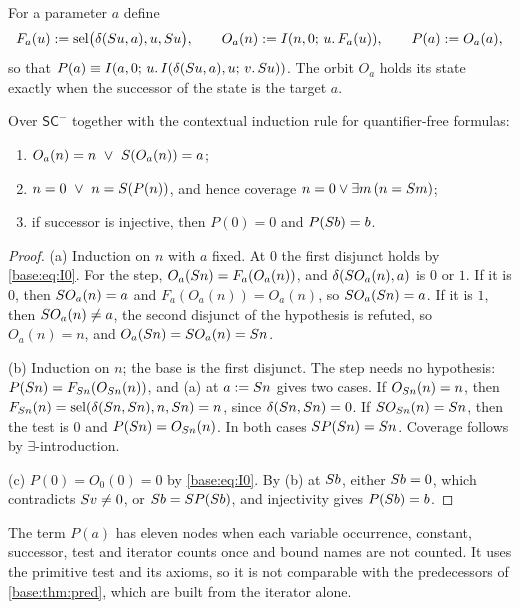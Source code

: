 For a parameter $a$ define
\[
 F_a(u)\mathrel{:=}\operatorname{sel}\bigl(\delta(S u,a),u,S u\bigr),\qquad
 O_a(n)\mathrel{:=}I(n,0;\,u.\,F_a(u)),\qquad
 P(a)\mathrel{:=} O_a(a),
\]
so that $P(a)\equiv I(a,0;\,u.\,I(\delta(S u,a),u;\,v.\,S u))$. The
orbit $O_a$ holds its state exactly when the successor of the state is the
target $a$.

\begin{proposition}
\label{disch:prop:sc-pred}
Over $\mathsf{SC}^{-}$ together with the contextual induction rule for
quantifier-free formulas:
\begin{enumerate}[label=\textup{(\alph*)}]
\item $O_a(n)=n\ \lor\ \Suc(O_a(n))=a$;
\item $n=0\ \lor\ n=S(P(n))$, and hence coverage
 $n=0\lor\exists m\,(n=S m)$;
\item if successor is injective, then $P(0)=0$ and $P(S b)=b$.
\end{enumerate}
\end{proposition}

\begin{proof}
(a) Induction on $n$ with $a$ fixed. At $0$ the first disjunct holds by
\eqref{base:eq:I0}. For the step, $O_a(S n)=F_a(O_a(n))$, and
$\delta(S O_a(n),a)$ is $0$ or $1$. If it is $0$, then
$S O_a(n)=a$ and $F_a(O_a(n))=O_a(n)$, so $S O_a(S n)=a$. If it is
$1$, then $S O_a(n)\neq a$, the second disjunct of the hypothesis is
refuted, so $O_a(n)=n$, and $O_a(S n)=S O_a(n)=S n$.

(b) Induction on $n$; the base is the first disjunct. The step needs no
hypothesis: $P(S n)=F_{S n}(O_{S n}(n))$, and (a) at $a\mathrel{:=}S n$
gives two cases. If $O_{S n}(n)=n$, then
$F_{S n}(n)=\operatorname{sel}(\delta(S n,S n),n,S n)=n$, since
$\delta(S n,S n)=0$. If $S O_{S n}(n)=S n$, then the test is
$0$ and $P(S n)=O_{S n}(n)$. In both cases $S P(S n)=S n$.
Coverage follows by $\exists$-introduction.

(c) $P(0)=O_0(0)=0$ by \eqref{base:eq:I0}. By (b) at $S b$, either
$S b=0$, which contradicts $S v\neq 0$, or $S b=S P(S b)$,
and injectivity gives $P(S b)=b$.
\end{proof}

The term $P(a)$ has eleven nodes when each variable occurrence, constant,
successor, test and iterator counts once and bound names are not counted.
It uses the primitive test and its axioms, so it is not comparable with the
predecessors of \cref{base:thm:pred}, which are built from the iterator
alone.

